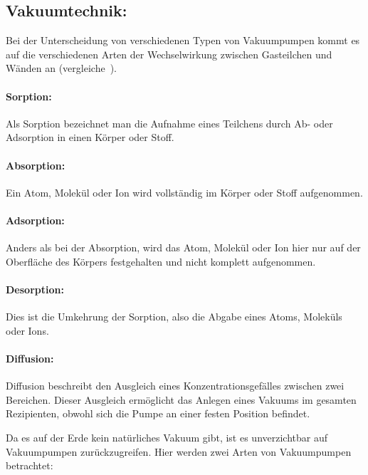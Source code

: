 \subsection{Vakuumtechnik:}
Bei der Unterscheidung von verschiedenen Typen von Vakuumpumpen kommt es auf die verschiedenen Arten der
Wechselwirkung zwischen Gasteilchen und Wänden an (vergleiche~\cite{pfeiffer}).

\paragraph{Sorption:}
Als Sorption bezeichnet man die Aufnahme eines Teilchens durch Ab- oder Adsorption
in einen Körper oder Stoff.

\paragraph{Absorption:}
Ein Atom, Molekül oder Ion wird vollständig im Körper oder Stoff aufgenommen.

\paragraph{Adsorption:}
Anders als bei der Absorption, wird das Atom, Molekül oder Ion hier nur auf der Oberfläche des Körpers
festgehalten und nicht komplett aufgenommen.

\paragraph{Desorption:}
Dies ist die Umkehrung der Sorption, also die Abgabe eines Atoms, Moleküls oder Ions.

\paragraph{Diffusion:}
Diffusion beschreibt den Ausgleich eines Konzentrationsgefälles zwischen
zwei Bereichen.
Dieser Ausgleich ermöglicht das Anlegen eines Vakuums im gesamten
Rezipienten, obwohl sich die Pumpe an einer festen Position befindet.

Da es auf der Erde kein natürliches Vakuum gibt, ist es unverzichtbar auf Vakuumpumpen zurückzugreifen.
Hier werden zwei Arten von Vakuumpumpen betrachtet:

